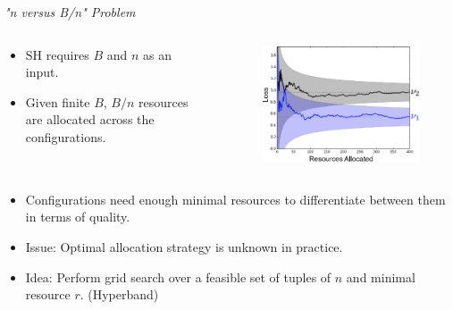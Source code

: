 
\begin{frame}{\emph{"n versus B/n" Problem}}
\begin{columns}

\begin{column}{.45\linewidth}
\begin{itemize}
    \item SH requires $B$ and $n$ as an input.
    \pause
    \item Given finite $B$, $B/n$ resources are allocated across the configurations.
    \pause
\end{itemize}
\end{column}

\begin{column}{.45\linewidth}

\begin{figure}
    \centering
    \vspace{2em}
    \includegraphics[width=0.9\linewidth]{w07_hpo_grey_box/images/intro/differetiatingConfigurations.png}
    \pause
\end{figure}
\end{column}
\end{columns}
\vspace{-10em}
\begin{columns}

\begin{column}{.45\linewidth}
\begin{itemize}
    \item Configurations need enough minimal resources to differentiate between them in terms of quality.
    \pause
    \item Issue: Optimal allocation strategy is unknown in practice.
    \pause
    \item Idea: Perform grid search over a feasible set of tuples of $n$ and minimal resource $r$. (Hyperband) 
\end{itemize}
\end{column}


\end{columns}
\end{frame}
